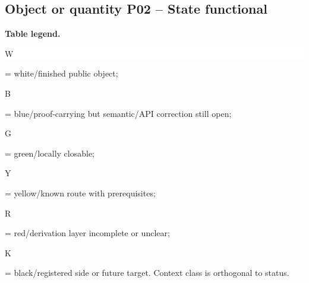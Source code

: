 \subsection*{Object or quantity P02 -- State functional}
\hypertarget{objproof:P02}{}
\par\smallskip\noindent\begin{minipage}{0.99\linewidth}\footnotesize\raggedright\textbf{Table legend.} \colorbox{white}{\strut W} = white/finished public object; \colorbox{cyan!20}{\strut B} = blue/proof-carrying but semantic/API correction still open; \colorbox{green!18}{\strut G} = green/locally closable; \colorbox{yellow!25}{\strut Y} = yellow/known route with prerequisites; \colorbox{red!20}{\strut R} = red/derivation layer incomplete or unclear; \colorbox{black!18}{\strut K} = black/registered side or future target. Context class is orthogonal to status.\end{minipage}\par\vspace{0.25em}
